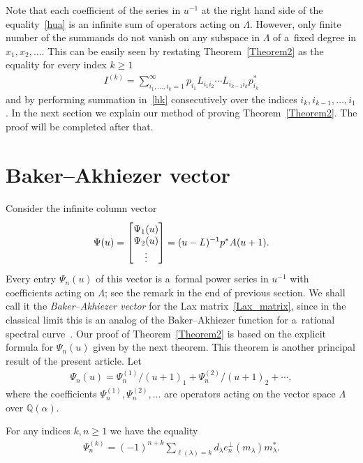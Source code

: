 Note that each coef\/f\/icient of the series in $u^{-1}$ at the right hand side of the
equality~\eqref{hua} is an inf\/inite sum of operators acting on $\Lambda$.
However, only f\/inite number of the summands do not vanish on any subspace in $\Lambda$ of a~f\/ixed
degree in $x_1,x_2,\ldots$.
This can be easily seen by restating Theorem~\ref{Theorem2} as the equality for every index $k\ge1$
\begin{gather}
\label{hk}
I^{(k)}=\sum_{i_1,\ldots,i_k=1}^\infty p_{i_1}
L_{i_1i_2}\cdots L_{i_{k-1}i_k}p^{\ast}_{i_k}
\end{gather}
and by performing summation in~\eqref{hk} consecutively over the indices $i_k,i_{k-1},\ldots,
i_1$.
In the next section we explain our method of proving Theorem~\ref{Theorem2}.
The proof will be completed after that.

\section[Baker-Akhiezer vector]{Baker--Akhiezer vector}\label{Section7}

Consider the inf\/inite column vector
\begin{gather}
\label{psiu}
\Psi(u)=
\begin{bmatrix}
\raisebox{0pt}[12pt][0pt]{$\Psi_1(u)$}
\\
\Psi_2(u)
\\
\vdots
\end{bmatrix}
=(u-L)^{-1}p^{\ast}A(u+1).
\end{gather}
Every entry $\Psi_n(u)$ of this vector is a~formal power series in $u^{-1}$ with coef\/f\/icients acting on
$\Lambda$; see the remark in the end of previous section.
We shall call it the \emph{Baker--Akhiezer vector} for the Lax matrix~\eqref{Lax_matrix}, since in the
classical limit this is an analog of the Baker--Akhiezer function for a~rational spectral curve~\cite{Skl}.
Our proof of Theorem~\ref{Theorem2} is based on the explicit formula for $\Psi_n(u)$ given by the next theorem.
This theorem is another principal result of the present article.
Let
\begin{gather*}
\Psi_n(u)=\Psi^{(1)}_n/(u+1)_1+\Psi^{(2)}_n/(u+1)_2+\cdots,
\end{gather*}
where the coef\/f\/icients $\Psi^{(1)}_n,\Psi^{(2)}_n,\ldots$ are operators
acting on the vector space $\Lambda$ over $\mathbb Q(\alpha)$.
\begin{theorem}\label{Theorem3}
For any indices $k,n\ge1$ we have the equality
\begin{gather}
\label{psink}
\Psi^{(k)}_n=(-1)^{n+k}\sum_{\ell(\lambda)=k}d_\lambda e_n^{
\perp}(m_\lambda)m_\lambda^{\ast}.
\end{gather}
\end{theorem}

